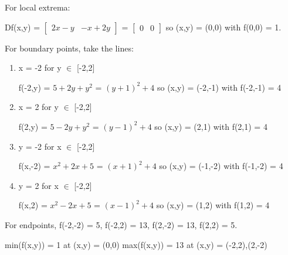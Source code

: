     \begin{tbox}
        For local extrema:
        
        \hspace{0.5cm}
        Df(x,y)
        = $\begin{bmatrix}
            2x - y & -x + 2y
        \end{bmatrix}$
        = $\begin{bmatrix}
            0 & 0
        \end{bmatrix}$
        so (x,y) = (0,0)
        with f(0,0) = 1.

        For boundary points, take the lines:

        \begin{enumerate}[label=(\alph*), leftmargin=1cm, itemsep=0.1cm]
            \item x = -2 for y $\in$ [-2,2]

                \hspace{0.5cm}
                f(-2,y)
                = $5 + 2y + y^2$
                = $(y+1)^2+4$
                so (x,y) = (-2,-1) with f(-2,-1) = 4

            \item x = 2 for y $\in$ [-2,2]

                \hspace{0.5cm}
                f(2,y)
                = $5 - 2y + y^2$
                = $(y-1)^2+4$
                so (x,y) = (2,1) with f(2,1) = 4

            \item y = -2 for x $\in$ [-2,2]

                \hspace{0.5cm}
                f(x,-2)
                = $x^2 + 2x + 5$
                = $(x+1)^2+4$
                so (x,y) = (-1,-2) with f(-1,-2) = 4

            \item y = 2 for x $\in$ [-2,2]

                \hspace{0.5cm}
                f(x,2)
                = $x^2 - 2x + 5$
                = $(x-1)^2+4$
                so (x,y) = (1,2) with f(1,2) = 4
        \end{enumerate}

        For endpoints,
        f(-2,-2) = 5,
        f(-2,2) = 13,
        f(2,-2) = 13,
        f(2,2) = 5.

        min(f(x,y)) = 1 at (x,y) = (0,0)
        \hspace{0.5cm}
        max(f(x,y)) = 13 at (x,y) = (-2,2),(2,-2)
    \end{tbox}

